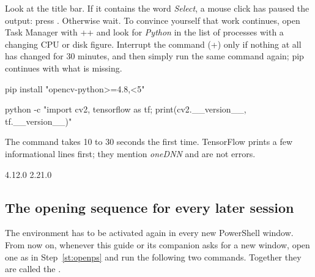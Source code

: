 \begin{iffail}
Look at the title bar. If it contains the word \emph{Select}, a mouse click has paused the
output: press . Otherwise wait. To convince yourself that work continues, open Task
Manager with ++ and look for \emph{Python} in the list of
processes with a changing CPU or disk figure. Interrupt the command (+) only if
nothing at all has changed for 30 minutes, and then simply run the same command again; pip
continues with what is missing.
\end{iffail}

\label{st:opencv}
\begin{ps}
pip install "opencv-python>=4.8,<5"
\end{ps}

\label{st:verifypy}
\begin{ps}
python -c "import cv2, tensorflow as tf; print(cv2.__version__, tf.__version__)"
\end{ps}
The command takes 10 to 30 seconds the first time. TensorFlow prints a few informational lines
first; they mention \emph{oneDNN} and are not errors.
\begin{out}
4.12.0 2.21.0
\end{out}

\subsection{The opening sequence for every later session}
\label{sec:opening}

The environment has to be activated again in every new PowerShell window. From now on, whenever
this guide or its companion asks for a new window, open one as in Step~\ref{st:openps} and run
the following two commands. Together they are called the .

